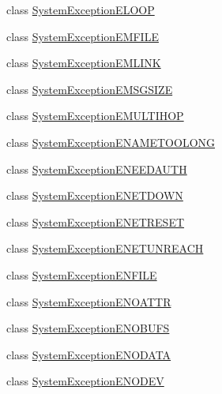 \begin{DoxyCompactItemize}
class \hyperlink{class_communication_1_1_exception_1_1_system_exception_e_l_o_o_p}{System\+Exception\+E\+L\+O\+O\+P}
\item 
class \hyperlink{class_communication_1_1_exception_1_1_system_exception_e_m_f_i_l_e}{System\+Exception\+E\+M\+F\+I\+L\+E}
\item 
class \hyperlink{class_communication_1_1_exception_1_1_system_exception_e_m_l_i_n_k}{System\+Exception\+E\+M\+L\+I\+N\+K}
\item 
class \hyperlink{class_communication_1_1_exception_1_1_system_exception_e_m_s_g_s_i_z_e}{System\+Exception\+E\+M\+S\+G\+S\+I\+Z\+E}
\item 
class \hyperlink{class_communication_1_1_exception_1_1_system_exception_e_m_u_l_t_i_h_o_p}{System\+Exception\+E\+M\+U\+L\+T\+I\+H\+O\+P}
\item 
class \hyperlink{class_communication_1_1_exception_1_1_system_exception_e_n_a_m_e_t_o_o_l_o_n_g}{System\+Exception\+E\+N\+A\+M\+E\+T\+O\+O\+L\+O\+N\+G}
\item 
class \hyperlink{class_communication_1_1_exception_1_1_system_exception_e_n_e_e_d_a_u_t_h}{System\+Exception\+E\+N\+E\+E\+D\+A\+U\+T\+H}
\item 
class \hyperlink{class_communication_1_1_exception_1_1_system_exception_e_n_e_t_d_o_w_n}{System\+Exception\+E\+N\+E\+T\+D\+O\+W\+N}
\item 
class \hyperlink{class_communication_1_1_exception_1_1_system_exception_e_n_e_t_r_e_s_e_t}{System\+Exception\+E\+N\+E\+T\+R\+E\+S\+E\+T}
\item 
class \hyperlink{class_communication_1_1_exception_1_1_system_exception_e_n_e_t_u_n_r_e_a_c_h}{System\+Exception\+E\+N\+E\+T\+U\+N\+R\+E\+A\+C\+H}
\item 
class \hyperlink{class_communication_1_1_exception_1_1_system_exception_e_n_f_i_l_e}{System\+Exception\+E\+N\+F\+I\+L\+E}
\item 
class \hyperlink{class_communication_1_1_exception_1_1_system_exception_e_n_o_a_t_t_r}{System\+Exception\+E\+N\+O\+A\+T\+T\+R}
\item 
class \hyperlink{class_communication_1_1_exception_1_1_system_exception_e_n_o_b_u_f_s}{System\+Exception\+E\+N\+O\+B\+U\+F\+S}
\item 
class \hyperlink{class_communication_1_1_exception_1_1_system_exception_e_n_o_d_a_t_a}{System\+Exception\+E\+N\+O\+D\+A\+T\+A}
\item 
class \hyperlink{class_communication_1_1_exception_1_1_system_exception_e_n_o_d_e_v}{System\+Exception\+E\+N\+O\+D\+E\+V}

\end{DoxyCompactItemize}
